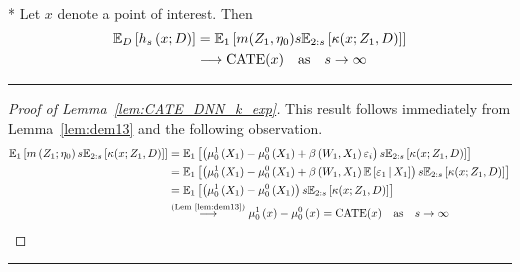 \begin{lem}\label{lem:CATE_DNN_k_exp}\mbox{}\\*
	Let $x$ denote a point of interest.
	Then
	\begin{equation}
		\begin{aligned}
			\mathbb{E}_D\left[h_s\left(x; D\right)\right]
			& = \mathbb{E}_{1}\left[m(Z_1, \eta_0)
			s\mathbb{E}_{2:s}\left[\kappa(x; Z_1, D)\right]\right]\\
			& \longrightarrow \operatorname{CATE}(x) \quad \text{as} \quad s \rightarrow \infty
		\end{aligned}
	\end{equation}
\end{lem}
\hrule
\begin{proof}[Proof of Lemma~\ref{lem:CATE_DNN_k_exp}]
	This result follows immediately from Lemma~\ref{lem:dem13} and the following observation.
	\begin{equation}
		\begin{aligned}
			\mathbb{E}_{1}\left[m\left(Z_{1}; \eta_{0}\right) s \mathbb{E}_{2:s}\left[\kappa(x; Z_1, D)\right]\right]
			 & = \mathbb{E}_{1}\left[\left(\mu_{0}^{1}\left(X_{1}\right) - \mu_{0}^{0}\left(X_{1}\right) + \beta\left(W_{1}, X_{1}\right)\varepsilon_{i}\right) s \mathbb{E}_{2:s}\left[\kappa(x; Z_1, D)\right]\right]                                \\
			 & = \mathbb{E}_{1}\left[\left(\mu_{0}^{1}\left(X_{1}\right) - \mu_{0}^{0}\left(X_{1}\right) + \beta\left(W_{1}, X_{1}\right)\mathbb{E}\left[\varepsilon_1 \, \middle| \, X_1\right]\right) s \mathbb{E}_{2:s}\left[\kappa(x; Z_1, D)\right]\right] \\
			 & = \mathbb{E}_{1}\left[\left(\mu_{0}^{1}\left(X_{1}\right) - \mu_{0}^{0}\left(X_{1}\right)\right) s \mathbb{E}_{2:s}\left[\kappa(x; Z_1, D)\right]\right]                                                                                \\
			 & \overset{\text{(Lem~\ref{lem:dem13})}}{\longrightarrow} \mu_{0}^{1}\left(x\right) - \mu_{0}^{0}\left(x\right)
             = \operatorname{CATE}(x)
			\quad \text{as} \quad s \rightarrow \infty
		\end{aligned}
	\end{equation}
\end{proof}

\hrule


